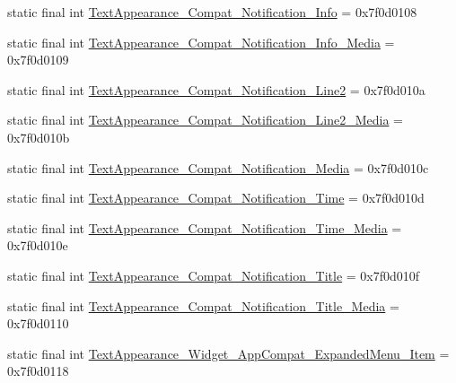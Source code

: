 \begin{DoxyCompactItemize}
\item 
static final int \mbox{\hyperlink{classandroid_1_1support_1_1v7_1_1appcompat_1_1R_1_1style_a8ca4f22679fe248d69f61337252841f9}{Text\+Appearance\+\_\+\+Compat\+\_\+\+Notification\+\_\+\+Info}} = 0x7f0d0108
\item 
static final int \mbox{\hyperlink{classandroid_1_1support_1_1v7_1_1appcompat_1_1R_1_1style_a0d8349ed41262b7c6575d0002d7f0c31}{Text\+Appearance\+\_\+\+Compat\+\_\+\+Notification\+\_\+\+Info\+\_\+\+Media}} = 0x7f0d0109
\item 
static final int \mbox{\hyperlink{classandroid_1_1support_1_1v7_1_1appcompat_1_1R_1_1style_ae26dbfc3e8f5073f7f43edd613571b9c}{Text\+Appearance\+\_\+\+Compat\+\_\+\+Notification\+\_\+\+Line2}} = 0x7f0d010a
\item 
static final int \mbox{\hyperlink{classandroid_1_1support_1_1v7_1_1appcompat_1_1R_1_1style_a2136f505d1700408e1486490195bd4a7}{Text\+Appearance\+\_\+\+Compat\+\_\+\+Notification\+\_\+\+Line2\+\_\+\+Media}} = 0x7f0d010b
\item 
static final int \mbox{\hyperlink{classandroid_1_1support_1_1v7_1_1appcompat_1_1R_1_1style_a099d961c0f0524311ae0c9a9965a4a34}{Text\+Appearance\+\_\+\+Compat\+\_\+\+Notification\+\_\+\+Media}} = 0x7f0d010c
\item 
static final int \mbox{\hyperlink{classandroid_1_1support_1_1v7_1_1appcompat_1_1R_1_1style_a0a4bcb87b0dbd416599a5247ad7d17f3}{Text\+Appearance\+\_\+\+Compat\+\_\+\+Notification\+\_\+\+Time}} = 0x7f0d010d
\item 
static final int \mbox{\hyperlink{classandroid_1_1support_1_1v7_1_1appcompat_1_1R_1_1style_a1ded2a27e92185cdc4acb96408169f8c}{Text\+Appearance\+\_\+\+Compat\+\_\+\+Notification\+\_\+\+Time\+\_\+\+Media}} = 0x7f0d010e
\item 
static final int \mbox{\hyperlink{classandroid_1_1support_1_1v7_1_1appcompat_1_1R_1_1style_a40ea1e59705aa63b129589fdb1a5fc10}{Text\+Appearance\+\_\+\+Compat\+\_\+\+Notification\+\_\+\+Title}} = 0x7f0d010f
\item 
static final int \mbox{\hyperlink{classandroid_1_1support_1_1v7_1_1appcompat_1_1R_1_1style_af129f043d597eeec59265bf2376e282d}{Text\+Appearance\+\_\+\+Compat\+\_\+\+Notification\+\_\+\+Title\+\_\+\+Media}} = 0x7f0d0110
\item 
static final int \mbox{\hyperlink{classandroid_1_1support_1_1v7_1_1appcompat_1_1R_1_1style_af4b9716161695143ddd2776e7821bfd3}{Text\+Appearance\+\_\+\+Widget\+\_\+\+App\+Compat\+\_\+\+Expanded\+Menu\+\_\+\+Item}} = 0x7f0d0118
\item 

\end{DoxyCompactItemize}
